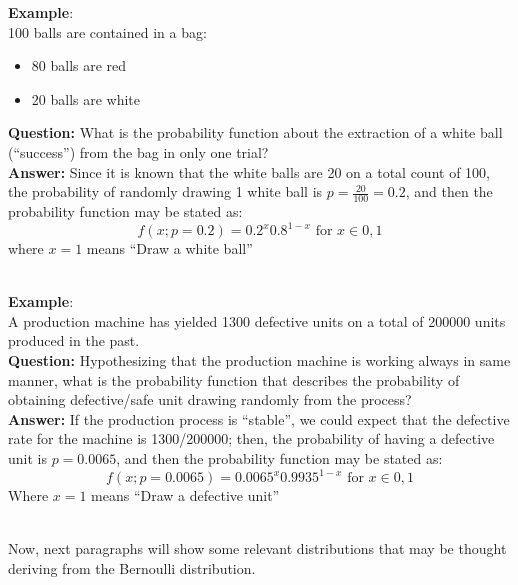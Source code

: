 \begin{frame}
  \vspace{-.2cm}
  \begin{small}
    \textbf{Example}:\\
    100 balls are contained in a bag: 
    \begin{itemize}
      \vspace{-.2cm}
      \item 80 balls are red
      \vspace{-.2cm}
      \item 20 balls are white
    \end{itemize}
    \vspace{.15cm}
    \textbf{Question:} What is the probability function about the extraction of a white ball (``success'')  from the bag in only one trial?\\
    \vspace{.3cm}
    \textbf{Answer:} Since it is known that the white balls are 20 on a total count of 100, the probability of randomly drawing 1 white ball is $p=\frac{20}{100}=0.2$, and then the probability function may be stated as:
    $$
      f(x;p=0.2)=0.2^x 0.8^{1-x} \mbox{     for } x \in {0,1}
    $$
    where $x=1$ means ``Draw a white ball'' \\ \hspace*{11cm} \Square \\
    \vspace{.3cm}
  \end{small}
\end{frame}


\begin{frame}
  \vspace{-.2cm}
  \begin{small}
    \textbf{Example}:\\
    A production machine has yielded 1300 defective units on a total of 200000 units produced in the past. \\
    \textbf{Question:} Hypothesizing that the production machine is working always in same manner, what is the probability function that describes the probability of obtaining defective/safe unit drawing randomly from the process?\\
    \vspace{.15cm}
    \textbf{Answer:} If the production process is ``stable'', we could expect that the defective rate for the machine is 1300/200000; then, the probability of having a defective unit is $p=0.0065$, and then the probability function may be stated as:
    $$
      f(x;p=0.0065)=0.0065^x 0.9935^{1-x} \mbox{     for } x \in {0,1}
    $$
    Where $x=1$ means ``Draw a defective unit'' \\ \hspace*{11cm} \Square \\
    \vspace*{.2cm}
  \end{small}
  Now, next paragraphs will show some relevant distributions that may be thought deriving from the Bernoulli distribution.
\end{frame}

